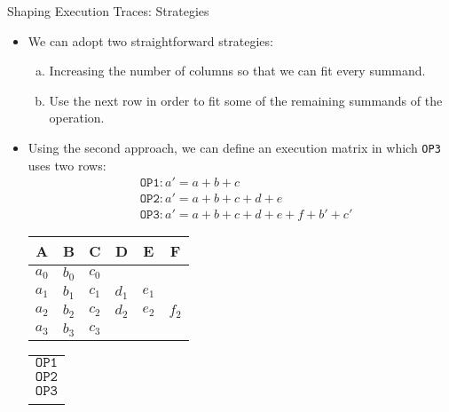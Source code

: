 \begin{frame}{Shaping Execution Traces: Strategies}
\begin{itemize}
\item We can adopt two straightforward strategies:
  \begin{enumerate}[a)]
  \item Increasing the number of columns so that we can fit every summand.
  \item Use the next row in order to fit some of the remaining summands of the operation.
  \end{enumerate}

\vspace{1em}

\item Using the second approach, we can define an execution matrix in which \texttt{OP3}
uses two rows:
\begin{align*}
&\texttt{OP1}: a'=a+b+c \\
&\texttt{OP2}: a'=a+b+c+d+e\\
&\texttt{OP3}: a'=a+b+c+d+e+f+b'+c'
\end{align*}

\scriptsize
\vspace{1em}

\begin{table}[h!]
\begin{tabular}{|c|c|c|c|c|c|}
\hline
\textbf{A} & \textbf{B} & \textbf{C} & \textbf{D} & \textbf{E} & \textbf{F} \\ \hline
$a_0$ & $b_0$ & $c_0$ & & &\\ \hline
$a_1$ & $b_1$ & $c_1$ & $d_1$ & $e_1$ & \\ \hline
\cellcolor{yellow} $a_2$ & \cellcolor{yellow} $b_2$ & \cellcolor{yellow}  $c_2$ & \cellcolor{yellow} $d_2$ & \cellcolor{yellow} $e_2$ & \cellcolor{yellow} $f_2$ \\ \hline
\cellcolor{green} $a_3$ & \cellcolor{yellow}  $b_3$ & \cellcolor{yellow}  $c_3$ &&& \\ \hline
\end{tabular}
\hspace{1em}
\begin{tabular}{c}
              \\
$\mathtt{OP1}$ \\
$\mathtt{OP2}$ \\
$\mathtt{OP3}$ \\
$             $ \\
\end{tabular}
\end{table}
\end{itemize}
\end{frame}






